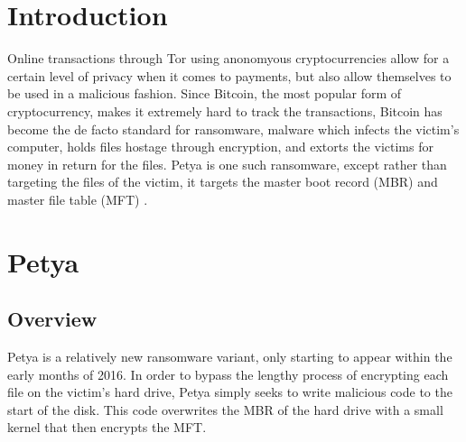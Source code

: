 \documentclass[twocolumn]{article}
\begin{document}

\section{Introduction}
Online transactions through Tor \cite{tor} using anonomyous cryptocurrencies allow for a certain level of privacy when it comes to payments, but also allow themselves to be used in a malicious fashion. Since Bitcoin, the most popular form of cryptocurrency, makes it extremely hard to track the transactions, Bitcoin has become the de facto standard for ransomware, malware which infects the victim's computer, holds files hostage through encryption, and extorts the victims for money in return for the files. Petya is one such ransomware, except rather than targeting the files of the victim, it targets the master boot record (MBR) and master file table (MFT) \cite{decryptPetya}.

\section{Petya}
\subsection{Overview}
Petya is a relatively new ransomware variant, only starting to appear within the early months of 2016. In order to bypass the lengthy process of encrypting each file on the victim's hard drive, Petya simply seeks to write malicious code to the start of the disk. This code overwrites the MBR of the hard drive with a small kernel that then encrypts the MFT. 
\end{document}
